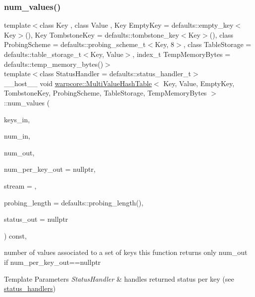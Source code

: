 \subsubsection{\texorpdfstring{num\+\_\+values()}{num\_values()}\hspace{0.1cm}{\footnotesize\ttfamily [2/3]}}
{\footnotesize\ttfamily template$<$class Key , class Value , Key Empty\+Key = defaults\+::empty\+\_\+key$<$\+Key$>$(), Key Tombstone\+Key = defaults\+::tombstone\+\_\+key$<$\+Key$>$(), class Probing\+Scheme  = defaults\+::probing\+\_\+scheme\+\_\+t$<$\+Key, 8$>$, class Table\+Storage  = defaults\+::table\+\_\+storage\+\_\+t$<$\+Key, Value$>$, index\+\_\+t Temp\+Memory\+Bytes = defaults\+::temp\+\_\+memory\+\_\+bytes()$>$ \\
template$<$class Status\+Handler  = defaults\+::status\+\_\+handler\+\_\+t$>$ \\
\+\_\+\+\_\+host\+\_\+\+\_\+ void \hyperlink{classwarpcore_1_1MultiValueHashTable}{warpcore\+::\+Multi\+Value\+Hash\+Table}$<$ Key, Value, Empty\+Key, Tombstone\+Key, Probing\+Scheme, Table\+Storage, Temp\+Memory\+Bytes $>$\+::num\+\_\+values (\begin{DoxyParamCaption}\item[{const key\+\_\+type $\ast$const}]{keys\+\_\+in,  }\item[{const index\+\_\+type}]{num\+\_\+in,  }\item[{index\+\_\+type \&}]{num\+\_\+out,  }\item[{index\+\_\+type $\ast$const}]{num\+\_\+per\+\_\+key\+\_\+out = {\ttfamily nullptr},  }\item[{const cuda\+Stream\+\_\+t}]{stream = {},  }\item[{const index\+\_\+type}]{probing\+\_\+length = {\ttfamily defaults\+:\+:probing\+\_\+length()},  }\item[{typename Status\+Handler\+::base\+\_\+type $\ast$const}]{status\+\_\+out = {\ttfamily nullptr} }\end{DoxyParamCaption}) const\hspace{0.3cm}{\ttfamily [inline]}, {\ttfamily [noexcept]}}



number of values associated to a set of keys  this function returns only {\ttfamily num\+\_\+out} if {\ttfamily num\+\_\+per\+\_\+key\+\_\+out==nullptr} 


\begin{DoxyTemplParams}{Template Parameters}
{\em Status\+Handler} & handles returned status per key (see {\ttfamily \hyperlink{namespacewarpcore_1_1status__handlers}{status\+\_\+handlers}}) \\
\hline
\end{DoxyTemplParams}

